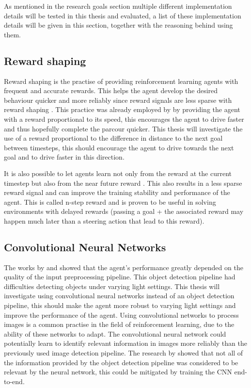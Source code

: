 As mentioned in the research goals section multiple different implementation details will be tested in this thesis and evaluated, a list of these implementation details will be given in this section, together with the reasoning behind using them.

\subsection{Reward shaping}

Reward shaping is the practise of providing reinforcement learning agents with frequent and accurate rewards. This helps the agent develop the desired behaviour quicker and more reliably since reward signals are less sparse with reward shaping \autocite{drl_for_ad}. This practice was already employed by \autocite{maximilian} by providing the agent with a reward proportional to its speed, this encourages the agent to drive faster and thus hopefully complete the parcour quicker. This thesis will investigate the use of a reward proportional to the difference in distance to the next goal between timesteps, this should encourage the agent to drive towards the next goal and to drive faster in this direction.

It is also possible to let agents learn not only from the reward at the current timestep but also from the near future reward \autocite{nstepreward}. This also results in a less sparse reward signal and can improve the training stability and performance of the agent. This is called n-step reward and is proven to be useful in solving environments with delayed rewards (passing a goal + the associated reward may happen much later than a steering action that lead to this reward).


\subsection{Convolutional Neural Networks}

The works by \autocite{merlin_flach} and \autocite{maximilian} showed that the agent's performance greatly depended on the quality of the input preprocessing pipeline. This object detection pipeline had difficulties detecting objects under varying light settings. This thesis will investigate using convolutional neural networks instead of an object detection pipeline, this should make the agent more robust to varying light settings and improve the performance of the agent.
Using convolutional networks to process images is a common practise in the field of reinforcement learning, due to the ability of these networks to adapt. The convolutional neural network could potentially learn to identify relevant information in images more reliably than the previously used image detection pipeline. The research by \autocite{merlin_flach} showed that not all of the information provided by the object detection pipeline was considered to be relevant by the neural network, this could be mitigated by training the CNN end-to-end.

